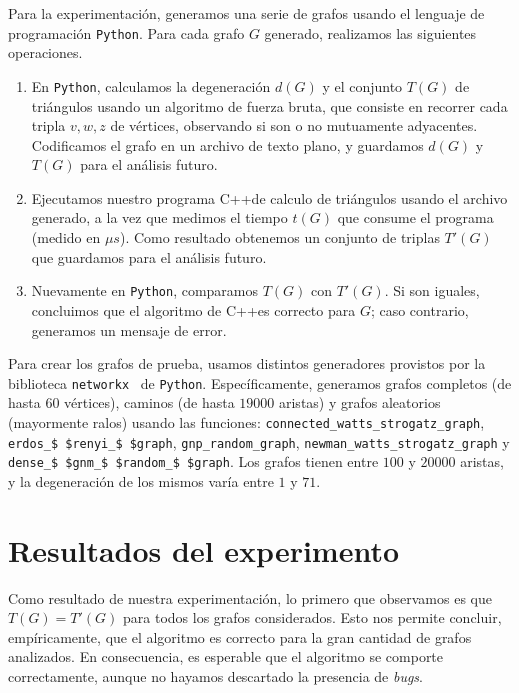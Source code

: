 \documentclass[%
    a4paper,%
    fontsize=12pt,%
    DIV=12,
    twoside,%
    openright,%
    titlepage=true,%
    headsepline,%
    toc=bibliography,%
    parskip=half,%
    cleardoublepage=empty,%
    headings=big,%
]{scrbook}
\makeatletter
\newcommand{\Code}[2][]{\lstinline[basicstyle={\ttfamily},#1]@#2@}
\DeclareRobustCommand{\CPP}{C\nolinebreak[4]\hspace{-.05em}\raisebox{.4ex}{\relsize{-3}\textbf{++}}\xspace}
\def\CPP{C++}%
\makeatother
\begin{document}
Para la experimentación, generamos una serie de grafos usando el lenguaje de programación \Code{Python}.  Para cada grafo $G$ generado, realizamos las siguientes operaciones.
\begin{enumerate}
  \item En \Code{Python}, calculamos la degeneración $d(G)$ y el conjunto $T(G)$ de triángulos usando un algoritmo de fuerza bruta, que consiste en recorrer cada tripla $v,w,z$ de vértices, observando si son o no mutuamente adyacentes.  Codificamos el grafo en un archivo de texto plano, y guardamos $d(G)$ y $T(G)$ para el análisis futuro.
  \item Ejecutamos nuestro programa \CPP de calculo de triángulos usando el archivo generado, a la vez que medimos el tiempo $t(G)$ que consume el programa (medido en $\mu s$).  Como resultado obtenemos un conjunto de triplas $T'(G)$ que guardamos para el análisis futuro. 
  \item Nuevamente en \Code{Python}, comparamos $T(G)$ con $T'(G)$.  Si son iguales, concluimos que el algoritmo de \CPP es correcto para $G$; caso contrario, generamos un mensaje de error.
\end{enumerate}
Para crear los grafos de prueba, usamos distintos generadores provistos por la biblioteca \Code{networkx}~\cite{HagbergSchultSwart2008} de \Code{Python}.  Específicamente, generamos grafos completos (de hasta $60$ vértices), caminos (de hasta $19000$ aristas) y grafos aleatorios (mayormente ralos) usando las funciones: \Code{connected_watts_strogatz_graph}, \Code[mathescape]{erdos_$ $renyi_$ $graph}, \Code{gnp_random_graph}, \Code{newman_watts_strogatz_graph} y \Code[mathescape]{dense_$ $gnm_$ $random_$ $graph}.  Los grafos tienen entre $100$ y $20000$ aristas, y la degeneración de los mismos varía entre $1$ y $71$.

\section{Resultados del experimento}

Como resultado de nuestra experimentación, lo primero que observamos es que $T(G) = T'(G)$ para todos los grafos considerados.  Esto nos permite concluir, empíricamente, que el algoritmo es correcto para la gran cantidad de grafos analizados.  En consecuencia, es esperable que el algoritmo se comporte correctamente, aunque no hayamos descartado la presencia de \emph{bugs}.    
\end{document}
